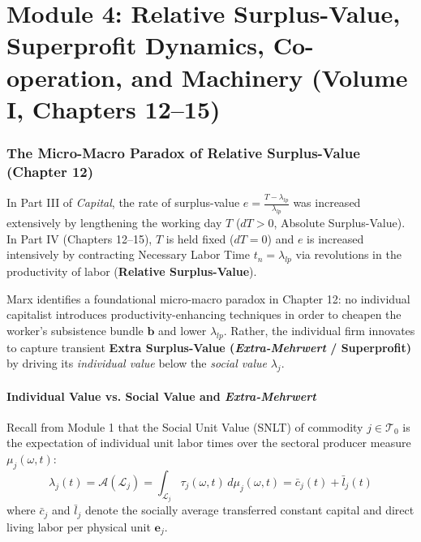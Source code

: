 \documentclass[11pt,a4paper]{article}
\begin{document}
\part{Module 4: Relative Surplus-Value, Superprofit Dynamics, Co-operation, and Machinery (Volume I, Chapters 12--15)}

\section{The Micro-Macro Paradox of Relative Surplus-Value (Chapter 12)}

In Part III of \textit{Capital}, the rate of surplus-value $e = \frac{T - \lambda_{lp}}{\lambda_{lp}}$ was increased extensively by lengthening the working day $T$ ($dT > 0$, Absolute Surplus-Value). In Part IV (Chapters 12--15), $T$ is held fixed ($dT = 0$) and $e$ is increased intensively by contracting Necessary Labor Time $t_n = \lambda_{lp}$ via revolutions in the productivity of labor (\textbf{Relative Surplus-Value}).

Marx identifies a foundational micro-macro paradox in Chapter 12: no individual capitalist introduces productivity-enhancing techniques in order to cheapen the worker's subsistence bundle $\mathbf{b}$ and lower $\lambda_{lp}$. Rather, the individual firm innovates to capture transient \textbf{Extra Surplus-Value (\textit{Extra-Mehrwert} / Superprofit)} by driving its \textit{individual value} below the \textit{social value} $\lambda_j$.

\subsection{Individual Value vs. Social Value and \textit{Extra-Mehrwert}}

Recall from Module 1 that the Social Unit Value (SNLT) of commodity $j \in \mathcal{T}_0$ is the expectation of individual unit labor times over the sectoral producer measure $\mu_j(\omega, t)$:
\begin{equation}
    \lambda_j(t) = \mathcal{A}(\mathcal{L}_j) = \int_{\mathcal{L}_j} \tau_j(\omega, t) \, d\mu_j(\omega, t) = \bar{c}_j(t) + \bar{l}_j(t)
\end{equation}
where $\bar{c}_j$ and $\bar{l}_j$ denote the socially average transferred constant capital and direct living labor per physical unit $\mathbf{e}_j$.
\end{document}

